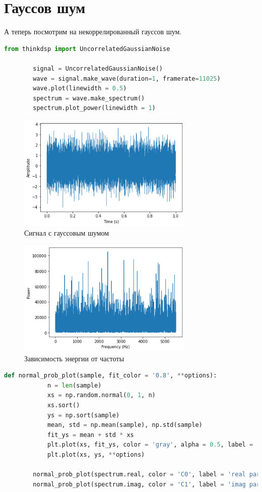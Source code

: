 \documentclass[a4paper, 12pt]{report}
\begin{document}
	\chapter{Гауссов шум}
	А теперь посмотрим на некоррелированный гауссов шум.
	\begin{lstlisting}[language=Python,caption=Гауссов шум]
		from thinkdsp import UncorrelatedGaussianNoise

		signal = UncorrelatedGaussianNoise()
		wave = signal.make_wave(duration=1, framerate=11025)
		wave.plot(linewidth = 0.5)
		spectrum = wave.make_spectrum()
		spectrum.plot_power(linewidth = 1)
	\end{lstlisting}
	\begin{figure}[H]
		\centering
		\includegraphics[width=0.75\textwidth]{gaus1.png}
		\caption{Сигнал с гауссовым шумом}
		\label{fig:gaus1}
	\end{figure}
	\begin{figure}[H]
		\centering
		\includegraphics[width=0.75\textwidth]{gaus2.png}
		\caption{Зависимость энергии от частоты}
		\label{fig:gaus2}
	\end{figure}
	\begin{lstlisting}[language=Python,caption=График нормальной вероятности]
		def normal_prob_plot(sample, fit_color = '0.8', **options):
			n = len(sample)
			xs = np.random.normal(0, 1, n)
			xs.sort()
			ys = np.sort(sample)
			mean, std = np.mean(sample), np.std(sample)
			fit_ys = mean + std * xs
			plt.plot(xs, fit_ys, color = 'gray', alpha = 0.5, label = 'model')
			plt.plot(xs, ys, **options)
		
		normal_prob_plot(spectrum.real, color = 'C0', label = 'real part')
		normal_prob_plot(spectrum.imag, color = 'C1', label = 'imag part')
	\end{lstlisting}
\end{document}
